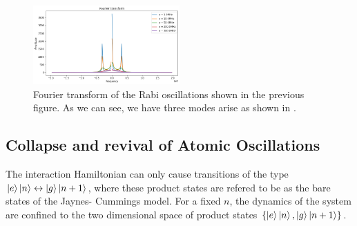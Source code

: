 \documentclass[%
 reprint,
 amsmath,amssymb,
 aps,
]{revtex4-2}
\begin{document}
\begin{figure}[ht]
    \centering
    \includegraphics[width=0.5\textwidth]{images/vacuum rabi modes.png}
    \caption{Fourier transform of the Rabi oscillations shown in the previous figure. As we can see, we have three modes arise as shown in \cite{jaynes-cumming}.}
\end{figure}
\subsection{Collapse and revival of Atomic Oscillations}
The interaction Hamiltonian can only cause transitions
of the type $\ket{e}\ket{n}\leftrightarrow\ket{g}\ket{n+1}$, where these product states are refered to be as the bare states of the Jaynes-
Cummings model. For a fixed $n$, the dynamics of the system are confined to the two dimensional space of product
states $\{\ket{e}\ket{n},\ket{g}\ket{n+1}\}$.
\end{document}
